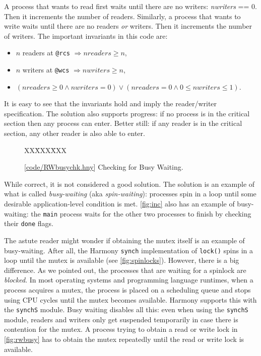 \documentclass{report}
\newcommand{\harmonysource}[1]{
\begin{tabbing}
XX\=XXX\=XXX\kill
    
\end{tabbing}
}
\newcommand{\harmonylink}[1]{%
[\href{https://www.cs.cornell.edu/home/rvr/harmony/#1}{\underline{#1}}]%
}
\newenvironment{code}{
\tcolorbox
}{
\endtcolorbox
}
\begin{document}
A process that wants to read first waits until there are no writers:
\textit{nwriters} == 0.  Then it increments the number of readers.
Similarly, a
process that wants to write waits until there are no readers \emph{or} writers.
Then it increments the number of writers.
The important invariants in this code are:
\begin{itemize}
\item $n$ readers at \texttt{@rcs} $\Rightarrow \mathit{nreaders} \ge n$,
\item $n$ writers at \texttt{@wcs} $\Rightarrow \mathit{nwriters} \ge n$,
\item $(\mathit{nreaders} \ge 0 \land \mathit{nwriters} = 0) \lor
    (\mathit{nreaders} = 0 \land 0 \le \mathit{nwriters} \le 1)$.
\end{itemize}
It is easy to see that the invariants hold and imply the reader/writer
specification.
The solution also supports progress: if no process is in the critical
section then any process can enter.  Better still: if any reader is in the
critical section, any other reader is also able to enter.

\begin{figure}
\begin{code}
\harmonysource{RWbusychk}
\end{code}
\caption{\harmonylink{code/RWbusychk.hny} Checking for Busy Waiting.}
\label{fig:rwblock}
\end{figure}

%

While correct, it is not considered a good solution.
The solution is an example of what is called \emph{busy-waiting}
%
(aka \emph{spin-waiting}):
%
processes spin in a loop until some desirable application-level condition is met.
\autoref{fig:inc} also has an example of busy-waiting: the \texttt{main}
process waits for the other two processes to finish by checking their \texttt{done}
flags.

The astute reader might wonder if obtaining the mutex itself is an
example of busy-waiting.  After all, the Harmony \texttt{synch} implementation
of \texttt{lock()} spins in a loop until the mutex is available
(see \autoref{fig:spinlocks}).
However, there is a big difference.  As we pointed out, the processes that
are waiting for a spinlock are \emph{blocked}.
In most operating systems and programming language runtimes,
when a process acquires a mutex, the process is placed on a scheduling
queue and stops using CPU cycles until the mutex becomes available.
Harmony supports this with the \texttt{synchS} module.
Busy waiting disables all this: even when using the \texttt{synchS}
module, readers and writers only get suspended temporarily in case
there is contention for the mutex.
A process trying to obtain a read or write lock in
\autoref{fig:rwbusy} has to obtain the mutex repeatedly
until the read or write lock is available.
\end{document}
